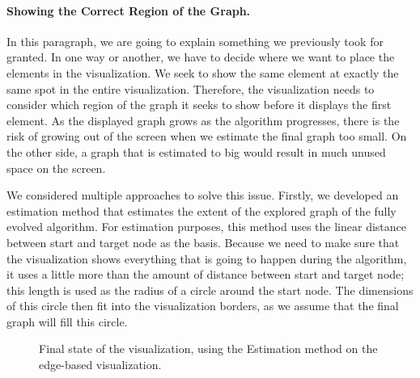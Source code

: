 \documentclass
[
    paper = a4,
    pagesize,
    12 pt,
    twoside,                       %
    open = right,
    DIV = calc,
    BCOR = 0 mm,                   %
    bibtotoc
]
{scrbook}
\begin{document}
\paragraph{Showing the Correct Region of the Graph.}
In this paragraph, we are going to explain something we previously took for granted.
In one way or another, we have to decide where we want to place the elements in the visualization.
We seek to show the same element at exactly the same spot in the entire visualization.
Therefore, the visualization needs to consider which region of the graph it seeks to show before it displays the first element.
As the displayed graph grows as the algorithm progresses, there is the risk of growing out of the screen when we estimate the final graph too small.
On the other side, a graph that is estimated to big would result in much unused space on the screen.

%

We considered multiple approaches to solve this issue.
Firstly, we developed an estimation method that estimates the extent of the explored graph of the fully evolved algorithm.
For estimation purposes, this method uses the linear distance between start and target node as the basis.
Because we need to make sure that the visualization shows everything that is going to happen during the algorithm, it uses a little more than the amount of distance between start and target node; this length is used as the radius of a circle around the start node.
The dimensions of this circle then fit into the visualization borders, as we assume that the final graph will fill this circle.

\begin{figure}
\caption[]{Final state of the visualization, using the Estimation method on the edge-based visualization.}
\label{fig:estimation}
\end{figure}
\end{document}
